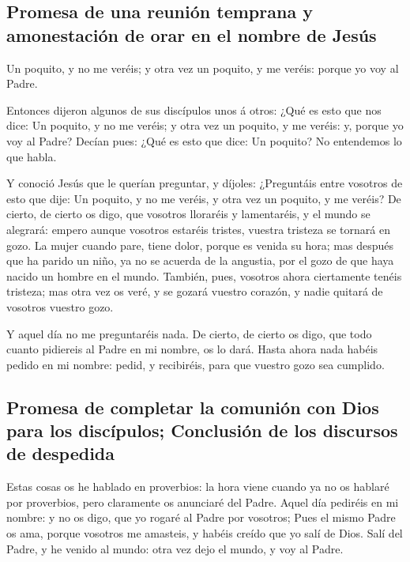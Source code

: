 \hypertarget{promesa-de-una-reuniuxf3n-temprana-y-amonestaciuxf3n-de-orar-en-el-nombre-de-jesuxfas}{%
\subsection{Promesa de una reunión temprana y amonestación de orar en el
nombre de
Jesús}\label{promesa-de-una-reuniuxf3n-temprana-y-amonestaciuxf3n-de-orar-en-el-nombre-de-jesuxfas}}

 Un poquito, y no me veréis; y otra vez un poquito, y me
veréis: porque yo voy al Padre.

 Entonces dijeron algunos de sus discípulos unos á otros:
¿Qué es esto que nos dice: Un poquito, y no me veréis; y otra vez un
poquito, y me veréis: y, porque yo voy al Padre?  Decían
pues: ¿Qué es esto que dice: Un poquito? No entendemos lo que habla.

 Y conoció Jesús que le querían preguntar, y díjoles:
¿Preguntáis entre vosotros de esto que dije: Un poquito, y no me veréis,
y otra vez un poquito, y me veréis?  De cierto, de cierto
os digo, que vosotros lloraréis y lamentaréis, y el mundo se alegrará:
empero aunque vosotros estaréis tristes, vuestra tristeza se tornará en
gozo.  La mujer cuando pare, tiene dolor, porque es
venida su hora; mas después que ha parido un niño, ya no se acuerda de
la angustia, por el gozo de que haya nacido un hombre en el mundo.
 También, pues, vosotros ahora ciertamente tenéis
tristeza; mas otra vez os veré, y se gozará vuestro corazón, y nadie
quitará de vosotros vuestro gozo.

 Y aquel día no me preguntaréis nada. De cierto, de
cierto os digo, que todo cuanto pidiereis al Padre en mi nombre, os lo
dará.  Hasta ahora nada habéis pedido en mi nombre:
pedid, y recibiréis, para que vuestro gozo sea cumplido.

\hypertarget{promesa-de-completar-la-comuniuxf3n-con-dios-para-los-discuxedpulos-conclusiuxf3n-de-los-discursos-de-despedida}{%
\subsection{Promesa de completar la comunión con Dios para los
discípulos; Conclusión de los discursos de
despedida}\label{promesa-de-completar-la-comuniuxf3n-con-dios-para-los-discuxedpulos-conclusiuxf3n-de-los-discursos-de-despedida}}

 Estas cosas os he hablado en proverbios: la hora viene
cuando ya no os hablaré por proverbios, pero claramente os anunciaré del
Padre.  Aquel día pediréis en mi nombre: y no os digo,
que yo rogaré al Padre por vosotros;  Pues el mismo Padre
os ama, porque vosotros me amasteis, y habéis creído que yo salí de
Dios.  Salí del Padre, y he venido al mundo: otra vez
dejo el mundo, y voy al Padre.

